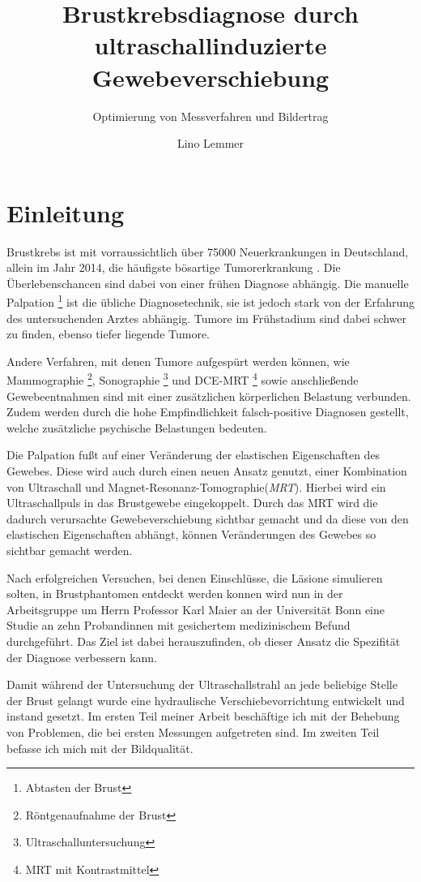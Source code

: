 \documentclass[
    11pt,
    ngerman
]{scrreprt}
\author{Lino Lemmer}
\title{Brustkrebsdiagnose durch ultraschallinduzierte Gewebeverschiebung}
\subtitle{Optimierung von Messverfahren und Bildertrag}
\begin{document}
\maketitle


\tableofcontents

\chapter{Einleitung}

Brustkrebs ist mit vorraussichtlich über 75000 Neuerkrankungen in Deutschland,
allein im Jahr 2014, die häufigste bösartige Tumorerkrankung
\parencite[68]{krebs_in_deutschland}. Die Überlebenschancen sind dabei von
einer frühen Diagnose abhängig. Die manuelle Palpation \footnote{Abtasten der
Brust} ist die übliche Diagnosetechnik, sie ist jedoch stark von der Erfahrung
des untersuchenden Arztes abhängig. Tumore im Frühstadium sind dabei schwer zu
finden, ebenso tiefer liegende Tumore.

Andere Verfahren, mit denen Tumore aufgespürt werden können, wie Mammographie
\footnote{Röntgenaufnahme der Brust}, Sonographie
\footnote{Ultraschalluntersuchung} und DCE-MRT \footnote{MRT mit
Kontrastmittel} sowie anschließende Gewebeentnahmen sind mit einer zusätzlichen
körperlichen Belastung verbunden. Zudem werden durch die hohe Empfindlichkeit
falsch-positive Diagnosen gestellt, welche zusätzliche psychische Belastungen
bedeuten.

Die Palpation fußt auf einer Veränderung der elastischen Eigenschaften des
Gewebes.
Diese wird auch durch einen neuen Ansatz genutzt, einer Kombination
von Ultraschall und Magnet-Resonanz-Tomographie(\emph{MRT}). Hierbei wird ein
Ultraschallpuls in das Brustgewebe eingekoppelt. Durch das MRT wird die dadurch
verursachte Gewebeverschiebung sichtbar gemacht und da diese von den
elastischen Eigenschaften abhängt, können Veränderungen des Gewebes so sichtbar
gemacht werden.

Nach erfolgreichen Versuchen, bei denen Einschlüsse, die Läsione simulieren
solten, in Brustphantomen entdeckt werden konnen \parencite{dipl_ulucay} wird
nun in der Arbeitsgruppe um Herrn Professor Karl Maier an der Universität Bonn
eine Studie an zehn Probandinnen mit gesichertem medizinischem Befund
durchgeführt. Das Ziel ist dabei herauszufinden, ob dieser Ansatz die
Spezifität der Diagnose verbessern kann.

Damit während der Untersuchung der Ultraschallstrahl an jede beliebige Stelle
der Brust gelangt wurde eine hydraulische Verschiebevorrichtung entwickelt und
instand gesetzt. Im ersten Teil meiner Arbeit beschäftige ich mit der Behebung
von Problemen, die bei ersten Messungen aufgetreten sind. Im zweiten Teil
befasse ich mich mit der Bildqualität.
\end{document}
